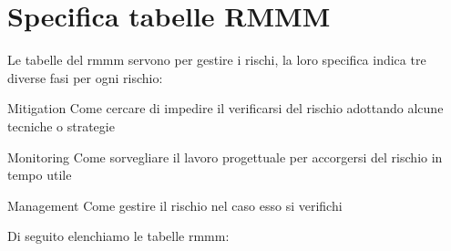 \section{Specifica tabelle RMMM}
Le tabelle del \gls{rmmm} servono per gestire i rischi, la loro specifica indica tre diverse fasi per ogni rischio:
\begin{descriptionInd}
	\item[Mitigation] Come cercare di impedire il verificarsi del rischio adottando alcune tecniche o strategie
	\item[Monitoring] Come sorvegliare il lavoro progettuale per accorgersi del rischio in tempo utile
	\item[Management] Come gestire il rischio nel caso esso si verifichi
\end{descriptionInd}
Di seguito elenchiamo le tabelle \gls{rmmm}:

